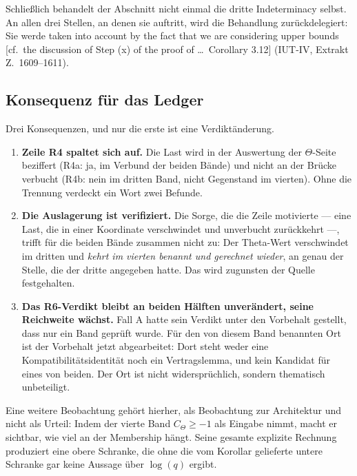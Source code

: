 \documentclass[11pt,a4paper]{article}
\theoremstyle{definition}
\newcommand{\anchor}[2]{(#1, Extrakt Z.~#2)}
\begin{document}
Schließlich behandelt der Abschnitt nicht einmal die dritte Indeterminacy selbst.
An allen drei Stellen, an denen sie auftritt, wird die Behandlung zurückdelegiert:
Sie werde \glqq taken into account by the fact that we are considering upper bounds
[cf.\ the discussion of Step (x) of the proof of \dots\ Corollary 3.12]\grqq
\anchor{IUT-IV}{1609--1611}.

\subsection{Konsequenz für das Ledger}

Drei Konsequenzen, und nur die erste ist eine Verdiktänderung.

\begin{enumerate}
\item \textbf{Zeile R4 spaltet sich auf.} Die Last wird in der Auswertung der
  $\Theta$-Seite beziffert (R4a: ja, im Verbund der beiden Bände) und nicht an
  der Brücke verbucht (R4b: nein im dritten Band, nicht Gegenstand im vierten).
  Ohne die Trennung verdeckt ein Wort zwei Befunde.
\item \textbf{Die Auslagerung ist verifiziert.} Die Sorge, die die Zeile
  motivierte --- eine Last, die in einer Koordinate verschwindet und unverbucht
  zurückkehrt ---, trifft für die beiden Bände zusammen nicht zu: Der Theta-Wert
  verschwindet im dritten und \emph{kehrt im vierten benannt und gerechnet
  wieder}, an genau der Stelle, die der dritte angegeben hatte. Das wird zugunsten
  der Quelle festgehalten.
\item \textbf{Das R6-Verdikt bleibt an beiden Hälften unverändert, seine
  Reichweite wächst.} Fall A hatte sein Verdikt unter den Vorbehalt gestellt,
  dass nur ein Band geprüft wurde. Für den von diesem Band benannten Ort ist der
  Vorbehalt jetzt abgearbeitet: Dort steht weder eine Kompatibilitätsidentität
  noch ein Vertragslemma, und kein Kandidat für eines von beiden. Der Ort ist
  nicht widersprüchlich, sondern thematisch unbeteiligt.
\end{enumerate}

Eine weitere Beobachtung gehört hierher, als Beobachtung zur Architektur und nicht
als Urteil: Indem der vierte Band $C_\Theta \ge -1$ als Eingabe nimmt, macht er sichtbar,
wie viel an der Membership hängt. Seine gesamte explizite Rechnung produziert eine
obere Schranke, die ohne die vom Korollar gelieferte untere Schranke gar keine
Aussage über $\log(q)$ ergibt.
\end{document}
